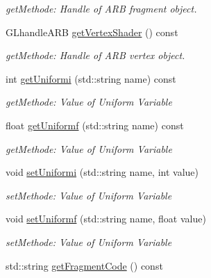 \begin{DoxyCompactItemize}
\begin{DoxyCompactList}\small\item\em getMethode: Handle of ARB fragment object. \item\end{DoxyCompactList}\item 
\hypertarget{class_f2_c_1_1_shader_g_l_a33c91072f429093f54ef24dbee4b9a14}{
GLhandleARB \hyperlink{class_f2_c_1_1_shader_g_l_a33c91072f429093f54ef24dbee4b9a14}{getVertexShader} () const }
\label{class_f2_c_1_1_shader_g_l_a33c91072f429093f54ef24dbee4b9a14}

\begin{DoxyCompactList}\small\item\em getMethode: Handle of ARB vertex object. \item\end{DoxyCompactList}\item 
int \hyperlink{class_f2_c_1_1_shader_g_l_a8304c74c8510dc66983d57d85011f64d}{getUniformi} (std::string name) const 
\begin{DoxyCompactList}\small\item\em getMethode: Value of Uniform Variable \item\end{DoxyCompactList}\item 
float \hyperlink{class_f2_c_1_1_shader_g_l_a3989aba1ff0ff23ec7f096e503f22f31}{getUniformf} (std::string name) const 
\begin{DoxyCompactList}\small\item\em getMethode: Value of Uniform Variable \item\end{DoxyCompactList}\item 
void \hyperlink{class_f2_c_1_1_shader_g_l_a9e063f0f5dcf576d19b345e2adae4fbd}{setUniformi} (std::string name, int value)
\begin{DoxyCompactList}\small\item\em setMethode: Value of Uniform Variable \item\end{DoxyCompactList}\item 
void \hyperlink{class_f2_c_1_1_shader_g_l_a0f960a4016258aa3d701bcef9821137b}{setUniformf} (std::string name, float value)
\begin{DoxyCompactList}\small\item\em setMethode: Value of Uniform Variable \item\end{DoxyCompactList}\item 
\hypertarget{class_f2_c_1_1_shader_g_l_a5909c91100cd3797a4b1998ca4bee4cd}{
std::string \hyperlink{class_f2_c_1_1_shader_g_l_a5909c91100cd3797a4b1998ca4bee4cd}{getFragmentCode} () const }
\label{class_f2_c_1_1_shader_g_l_a5909c91100cd3797a4b1998ca4bee4cd}


\end{DoxyCompactItemize}
